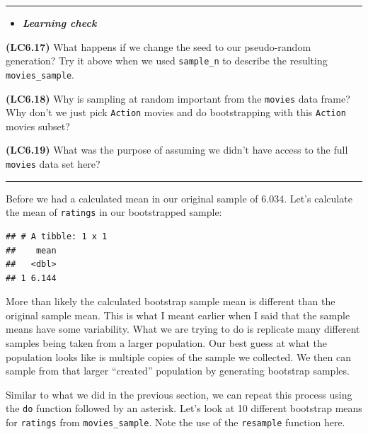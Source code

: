 \documentclass[]{tufte-book}
\newenvironment{Shaded}{\begin{snugshade}}{\end{snugshade}}
\newcommand{\KeywordTok}[1]{\textcolor[rgb]{0.13,0.29,0.53}{\textbf{{#1}}}}
\newcommand{\DataTypeTok}[1]{\textcolor[rgb]{0.13,0.29,0.53}{{#1}}}
\newcommand{\StringTok}[1]{\textcolor[rgb]{0.31,0.60,0.02}{{#1}}}
\newcommand{\NormalTok}[1]{{#1}}
\newenvironment{rmdblock}[1]
  {\begin{shaded*}
  \begin{itemize}
  \renewcommand{\labelitemi}{
    \raisebox{-.7\height}[0pt][0pt]{
    }
  }
  \item
  }
  {
  \end{itemize}
  \end{shaded*}
  }
\newenvironment{learncheck}
  {\begin{rmdblock}{warning}}
  {\end{rmdblock}}
\begin{document}
\begin{center}\rule{\linewidth}{\linethickness}\end{center}

\begin{learncheck}
\textbf{\emph{Learning check}}
\end{learncheck}

\textbf{(LC6.17)} What happens if we change the seed to our
pseudo-random generation? Try it above when we used \texttt{sample\_n}
to describe the resulting \texttt{movies\_sample}.

\textbf{(LC6.18)} Why is sampling at random important from the
\texttt{movies} data frame? Why don't we just pick \texttt{Action}
movies and do bootstrapping with this \texttt{Action} movies subset?

\textbf{(LC6.19)} What was the purpose of assuming we didn't have access
to the full \texttt{movies} data set here?

\begin{center}\rule{\linewidth}{\linethickness}\end{center}

Before we had a calculated mean in our original sample of 6.034. Let's
calculate the mean of \texttt{ratings} in our bootstrapped sample:

\begin{Shaded}
\end{Shaded}

\begin{verbatim}
## # A tibble: 1 x 1
##    mean
##   <dbl>
## 1 6.144
\end{verbatim}

More than likely the calculated bootstrap sample mean is different than
the original sample mean. This is what I meant earlier when I said that
the sample means have some variability. What we are trying to do is
replicate many different samples being taken from a larger population.
Our best guess at what the population looks like is multiple copies of
the sample we collected. We then can sample from that larger ``created''
population by generating bootstrap samples.

Similar to what we did in the previous section, we can repeat this
process using the \texttt{do} function followed by an asterisk. Let's
look at 10 different bootstrap means for \texttt{ratings} from
\texttt{movies\_sample}. Note the use of the \texttt{resample} function
here.
\end{document}
